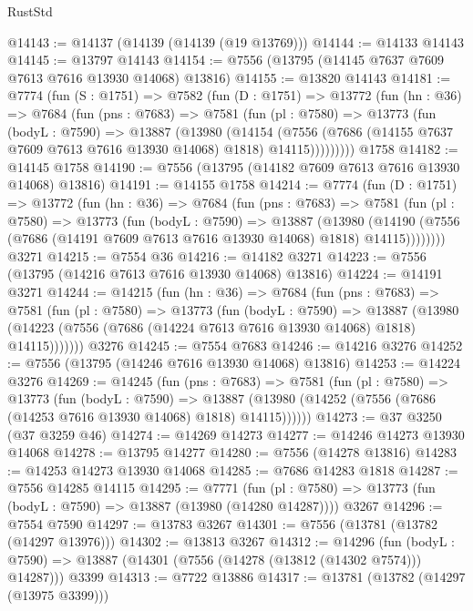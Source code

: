 \begin{lexlean}{RustStd}
\begin{coremodule}
@14143 := @14137 (@14139 (@14139 (@19 @13769)))
@14144 := @14133 @14143
@14145 := @13797 @14143
@14154 := @7556 (@13795 (@14145 @7637 @7609 @7613 @7616 @13930 @14068) @13816)
@14155 := @13820 @14143
@14181 := @7774
    (fun (S : @1751) =>
    @7582
      (fun (D : @1751) =>
      @13772
        (fun (hn : @36) =>
        @7684
          (fun (pns : @7683) =>
          @7581
            (fun (pl : @7580) =>
            @13773
              (fun (bodyL : @7590) =>
              @13887
                (@13980
                  (@14154
                    (@7556
                      (@7686 (@14155 @7637 @7609 @7613 @7616 @13930 @14068) @1818)
                      @14115)))))))))
    @1758
@14182 := @14145 @1758
@14190 := @7556 (@13795 (@14182 @7609 @7613 @7616 @13930 @14068) @13816)
@14191 := @14155 @1758
@14214 := @7774
    (fun (D : @1751) =>
    @13772
      (fun (hn : @36) =>
      @7684
        (fun (pns : @7683) =>
        @7581
          (fun (pl : @7580) =>
          @13773
            (fun (bodyL : @7590) =>
            @13887
              (@13980
                (@14190 (@7556 (@7686 (@14191 @7609 @7613 @7616 @13930 @14068) @1818) @14115))))))))
    @3271
@14215 := @7554 @36
@14216 := @14182 @3271
@14223 := @7556 (@13795 (@14216 @7613 @7616 @13930 @14068) @13816)
@14224 := @14191 @3271
@14244 := @14215
    (fun (hn : @36) =>
    @7684
      (fun (pns : @7683) =>
      @7581
        (fun (pl : @7580) =>
        @13773
          (fun (bodyL : @7590) =>
          @13887
            (@13980 (@14223 (@7556 (@7686 (@14224 @7613 @7616 @13930 @14068) @1818) @14115)))))))
    @3276
@14245 := @7554 @7683
@14246 := @14216 @3276
@14252 := @7556 (@13795 (@14246 @7616 @13930 @14068) @13816)
@14253 := @14224 @3276
@14269 := @14245
    (fun (pns : @7683) =>
    @7581
      (fun (pl : @7580) =>
      @13773
        (fun (bodyL : @7590) =>
        @13887 (@13980 (@14252 (@7556 (@7686 (@14253 @7616 @13930 @14068) @1818) @14115))))))
@14273 := @37 @3250 (@37 @3259 @46)
@14274 := @14269 @14273
@14277 := @14246 @14273 @13930 @14068
@14278 := @13795 @14277
@14280 := @7556 (@14278 @13816)
@14283 := @14253 @14273 @13930 @14068
@14285 := @7686 @14283 @1818
@14287 := @7556 @14285 @14115
@14295 := @7771
    (fun (pl : @7580) => @13773 (fun (bodyL : @7590) => @13887 (@13980 (@14280 @14287))))
    @3267
@14296 := @7554 @7590
@14297 := @13783 @3267
@14301 := @7556 (@13781 (@13782 (@14297 @13976)))
@14302 := @13813 @3267
@14312 := @14296
    (fun (bodyL : @7590) => @13887 (@14301 (@7556 (@14278 (@13812 (@14302 @7574))) @14287)))
    @3399
@14313 := @7722 @13886
@14317 := @13781 (@13782 (@14297 (@13975 @3399)))

\end{coremodule}
\end{lexlean}
